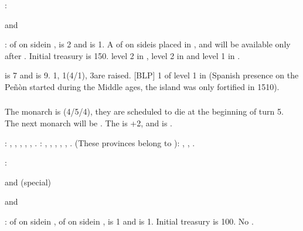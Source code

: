 :
\begin{modlist}
\item[\SUB] \paysgenes
\item[\RM] \payspapaute and \paysnaples
\end{modlist}

:
\bparag \MNU of  on side\facemoins in \provinceToledo, \FTI is 2
and \DTI is 1. A \MNU of  on side\faceplus is placed in
\provinceVlaanderen, and will be available only after .
\bparag Initial treasury is 150\ducats.
\bparag \TradeFLEET level 2 in , level 2 in  and level
1 in .

\aparag {} is 7 and  is
9. 1\ARMY\faceplus, 1\FLEET\facemoins (4\NGD/1\NTD), 3\ND are raised. [BLP] 1
\Presidio of level 1 in  (Spanish presence on the Peñòn
started during the Middle ages, the island was only fortified in 1510).


\subsubsection{\paysmajeurPologne}
\aparag The monarch is  (4/5/4), they are
scheduled to die at the beginning of turn 5. The next monarch will be
. The \STAB is +2, and \POL is .

: \provinceWielkopolska, , \provinceDanzig, \provinceLublin, \provinceMalopolska,
\provinceWolyn.
: \provinceLietuva, \provinceSmolenska,
\provinceBaltarusija, \provinceSeveria, \provinceZemaitija, \provincePolacak
\provincePrypec.
 (These provinces belong to \paysUkraine):
\provinceUkrainya, \provincePodolie, \provincePoltava.

:
\begin{modlist}
\item[\VASSAL] \paysMazovie and \paysUkraine (special)
\item[\RM] \paysHongrie and \paysBoheme
\end{modlist}

:
\bparag \MNU of  on side\facemoins in \provinceLietuva, \MNU of
 on side\facemoins in \provinceWielkopolska, \FTI is 1 and \DTI is
1.
\bparag Initial treasury is 100\ducats.
\bparag No \TradeFLEET.

